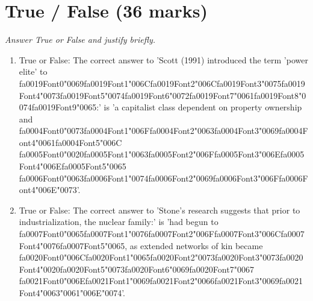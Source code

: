 \documentclass[12pt]{article}
\begin{document}
\section*{True / False (36 marks)}
\textit{Answer True or False and justify briefly.}
\begin{enumerate}[label=\arabic*.]
\item True or False: The correct answer to 'Scott (1991) introduced the term 'power elite' to {\csname fa0019Font0\endcsname\char"0069}{\csname fa0019Font1\endcsname\char"006C}{\csname fa0019Font2\endcsname\char"006C}{\csname fa0019Font3\endcsname\char"0075}{\csname fa0019Font4\endcsname\char"0073}{\csname fa0019Font5\endcsname\char"0074}{\csname fa0019Font6\endcsname\char"0072}{\csname fa0019Font7\endcsname\char"0061}{\csname fa0019Font8\endcsname\char"0074}{\csname fa0019Font9\endcsname\char"0065}:' is 'a capitalist class dependent on property ownership and {\csname fa0004Font0\endcsname\char"0073}{\csname fa0004Font1\endcsname\char"006F}{\csname fa0004Font2\endcsname\char"0063}{\csname fa0004Font3\endcsname\char"0069}{\csname fa0004Font4\endcsname\char"0061}{\csname fa0004Font5\endcsname\char"006C} {\csname fa0005Font0\endcsname\char"0020}{\csname fa0005Font1\endcsname\char"0063}{\csname fa0005Font2\endcsname\char"006F}{\csname fa0005Font3\endcsname\char"006E}{\csname fa0005Font4\endcsname\char"006E}{\csname fa0005Font5\endcsname\char"0065} {\csname fa0006Font0\endcsname\char"0063}{\csname fa0006Font1\endcsname\char"0074}{\csname fa0006Font2\endcsname\char"0069}{\csname fa0006Font3\endcsname\char"006F}{\csname fa0006Font4\endcsname\char"006E}{\char"0073}'.
\item True or False: The correct answer to 'Stone's research suggests that prior to industrialization, the nuclear family:' is 'had begun to {\csname fa0007Font0\endcsname\char"0065}{\csname fa0007Font1\endcsname\char"0076}{\csname fa0007Font2\endcsname\char"006F}{\csname fa0007Font3\endcsname\char"006C}{\csname fa0007Font4\endcsname\char"0076}{\csname fa0007Font5\endcsname\char"0065}, as extended networks of kin became {\csname fa0020Font0\endcsname\char"006C}{\csname fa0020Font1\endcsname\char"0065}{\csname fa0020Font2\endcsname\char"0073}{\csname fa0020Font3\endcsname\char"0073}{\csname fa0020Font4\endcsname\char"0020}{\csname fa0020Font5\endcsname\char"0073}{\csname fa0020Font6\endcsname\char"0069}{\csname fa0020Font7\endcsname\char"0067} {\csname fa0021Font0\endcsname\char"006E}{\csname fa0021Font1\endcsname\char"0069}{\csname fa0021Font2\endcsname\char"0066}{\csname fa0021Font3\endcsname\char"0069}{\csname fa0021Font4\endcsname\char"0063}{\char"0061}{\char"006E}{\char"0074}'.

\end{enumerate}
\end{document}
